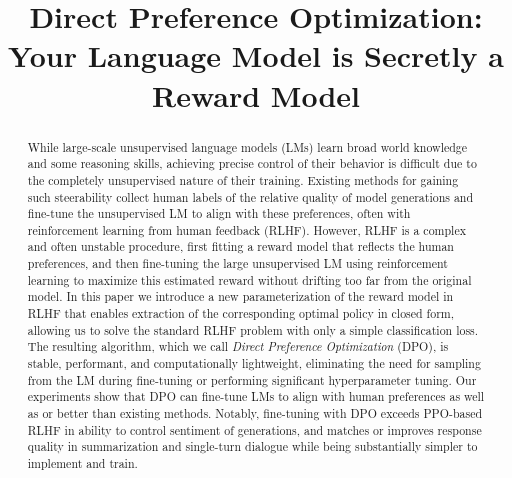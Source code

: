 \title{Direct Preference Optimization: Your Language Model is Secretly a Reward Model}

\begin{abstract}
While large-scale unsupervised language models (LMs) learn broad world knowledge and some reasoning skills, achieving precise control of their behavior is difficult due to the completely unsupervised nature of their training. Existing methods for gaining such steerability collect human labels of the relative quality of model generations and fine-tune the unsupervised LM to align with these preferences, often with reinforcement learning from human feedback (RLHF). However, RLHF is a complex and often unstable procedure, first fitting a reward model that reflects the human preferences, and then fine-tuning the large unsupervised LM using reinforcement learning to maximize this estimated reward without drifting too far from the original model. {In this paper we introduce a new parameterization of the reward model in RLHF that enables extraction of the corresponding optimal policy in closed form, allowing us to solve the standard RLHF problem with only a simple classification loss.} The resulting algorithm, which we call \textit{Direct Preference Optimization} (DPO), is stable, performant, and computationally lightweight, eliminating the need for {} sampling from the LM during fine-tuning or performing significant hyperparameter tuning. Our experiments show that DPO can fine-tune LMs to align with human preferences as well as or better than existing methods. Notably, fine-tuning with DPO exceeds PPO-based RLHF in ability to control sentiment of generations, and matches or improves response quality in summarization and single-turn dialogue while being substantially simpler to implement and train.
\end{abstract}

